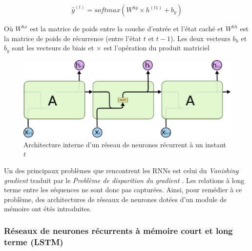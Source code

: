 		\begin{equation}
			\hat{y}^{(t)} = softmax(W^{hy} \times h^{(t1)} + b_y)
		\end{equation}
		
		Où $W^{hx}$ est la matrice de poids entre la couche d'entrée et l'état caché et $W^{hh}$ est la matrice de poids de récurrence (entre l'état $t$ et $t-1$). Les deux vecteurs $b_h$ et $b_y$ sont les vecteurs de biais et $\times$ est l'opération du produit matriciel\cite{rnn_lstms}
		
		\begin{figure}[H]
			\centering
			
			\includegraphics[width=0.5\linewidth]{images/notions/rnns_unrolled_online.png}
			\caption{Architecture interne d'un réseau de neurones récurrent à un instant $t$ \cite{rnns_online}}
		\end{figure}
		\par 
		Un des principaux problèmes que rencontrent les RNNs est celui du \textit{Vanishing gradient} traduit par le \textit{Problème de disparition du gradient} \cite{vanishing_gradient}. Les relations à long terme entre les séquences ne sont donc pas capturées. Ainsi, pour remédier à ce problème, des architectures de réseaux de neurones dotées d'un module de mémoire ont étés introduites.
		
		\subsubsection*{Réseaux de neurones récurrents à mémoire court et long terme (LSTM)}
